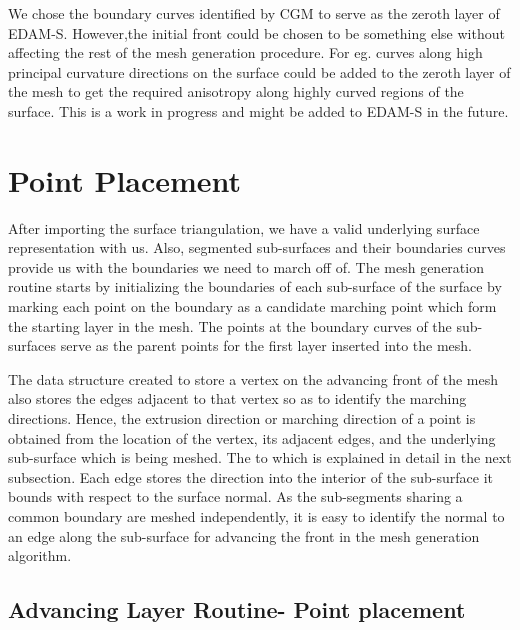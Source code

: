 We chose the boundary curves identified by CGM to serve as the zeroth layer of EDAM-S. However,the initial front could be chosen to be something else without affecting the rest of the mesh generation procedure. For eg. curves along high principal curvature directions on the surface could be added to the zeroth layer of the mesh to get the required anisotropy along highly curved regions of the surface. This is a work in progress and might be added to EDAM-S in the future.

\section{Point Placement}

After importing the surface triangulation, we have a valid underlying surface representation with us. Also, segmented sub-surfaces and their boundaries curves provide us with the boundaries we need to march off of. The mesh generation routine starts by initializing the boundaries of each sub-surface of the surface by marking each point on the boundary as a candidate marching point which form the starting layer in the mesh. The points at the boundary curves of the sub-surfaces serve as the parent points for the first layer inserted into the mesh.

The data structure created to store a vertex on the advancing front of the mesh also stores the edges adjacent to that vertex so as to identify the marching directions. Hence, the extrusion direction or marching direction of a point is obtained from the location of the vertex, its adjacent edges, and the underlying sub-surface which is being meshed. The 
to  which is explained in detail in the next subsection. Each edge stores the direction into the interior of the sub-surface it bounds with respect to the surface normal. As the sub-segments sharing a common boundary are meshed independently, it is easy to identify the normal to an edge along the sub-surface for advancing the front in the mesh generation algorithm.

%  

\subsection{Advancing Layer Routine- Point placement} \label{advancing-layer}

